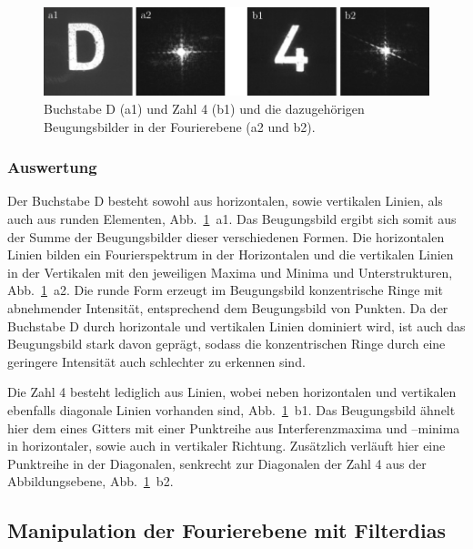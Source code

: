 \begin{figure}[h]
	\centering
	\includegraphics{images/Regina/abb19.pdf}
	\caption[Ziffern mit Fourierspektren]{
		Buchstabe D (a1) und Zahl 4 (b1) und die dazugehörigen Beugungsbilder in der Fourierebene (a2 und b2).
	}
	\label{fig:ziffern_mit_spektren}
\end{figure}

\subsubsection*{Auswertung}

Der Buchstabe D besteht sowohl aus horizontalen, sowie vertikalen Linien, als auch aus runden Elementen, Abb.~\ref{fig:ziffern_mit_spektren}~a1. Das Beugungsbild ergibt sich somit aus der Summe der Beugungsbilder dieser verschiedenen Formen. Die horizontalen Linien bilden ein Fourierspektrum in der Horizontalen und die vertikalen Linien in der Vertikalen mit den jeweiligen Maxima und Minima und Unterstrukturen, Abb.~\ref{fig:ziffern_mit_spektren}~a2. Die runde Form erzeugt im Beugungsbild konzentrische Ringe mit abnehmender Intensität, entsprechend dem Beugungsbild von Punkten. Da der Buchstabe D durch horizontale und vertikalen Linien dominiert wird, ist auch das Beugungsbild stark davon geprägt, sodass die konzentrischen Ringe durch eine geringere Intensität auch schlechter zu erkennen sind.

Die Zahl 4 besteht lediglich aus Linien, wobei neben horizontalen und vertikalen ebenfalls diagonale Linien vorhanden sind, Abb.~\ref{fig:ziffern_mit_spektren}~b1. Das Beugungsbild ähnelt hier dem eines Gitters mit einer Punktreihe aus Interferenzmaxima und –minima in horizontaler, sowie auch in vertikaler Richtung. Zusätzlich verläuft hier eine Punktreihe in der Diagonalen, senkrecht zur Diagonalen der Zahl 4 aus der Abbildungsebene, Abb.~\ref{fig:ziffern_mit_spektren}~b2.


\subsection{Manipulation der Fourierebene mit Filterdias}

